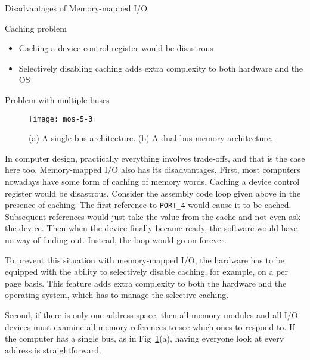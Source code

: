 \begin{frame}{Disadvantages of Memory-mapped I/O}
  \begin{block}{Caching problem}
    \begin{itemize}
    \item Caching a device control register would be disastrous
    \item Selectively disabling caching adds extra complexity to both hardware and the OS
    \end{itemize}
  \end{block}
  \begin{block}{Problem with multiple buses}
    \begin{figure}[h]
      \centering
      \texttt{[image: mos-5-3]}
      \caption{(a) A single-bus architecture. (b) A dual-bus memory architecture.}
      \label{fig:mmap-bus}
    \end{figure}
  \end{block}  
\end{frame}

In computer design, practically everything involves trade-offs, and that is the case here
too. Memory-mapped I/O also has its disadvantages. First, most computers nowadays have
some form of caching of memory words. Caching a device control register would be
disastrous. Consider the assembly code loop given above in the presence of caching. The
first reference to \texttt{PORT\_4} would cause it to be cached. Subsequent references would
just take the value from the cache and not even ask the device. Then when the device
finally became ready, the software would have no way of finding out. Instead, the loop
would go on forever.

To prevent this situation with memory-mapped I/O, the hardware has to be equipped with the
ability to selectively disable caching, for example, on a per page basis. This feature
adds extra complexity to both the hardware and the operating system, which has to manage
the selective caching.

Second, if there is only one address space, then all memory modules and all I/O devices
must examine all memory references to see which ones to respond to.  If the computer has a
single bus, as in Fig~\ref{fig:mmap-bus}(a), having everyone look at every address is
straightforward.


